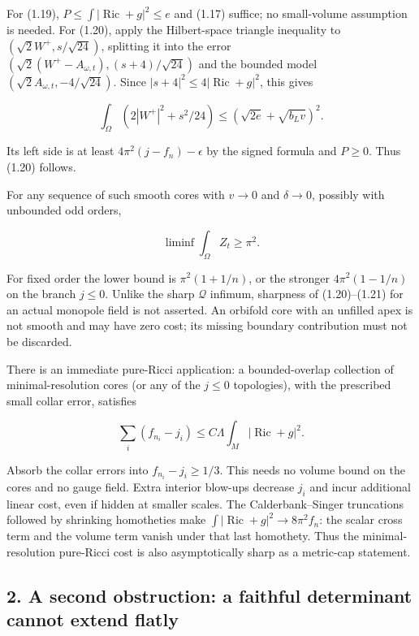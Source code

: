 \documentclass[
  10pt,
]{article}
\begin{document}
For (1.19), \(P\le\int|\operatorname{Ric}+g|^2\le e\) and (1.17)
suffice; no small-volume assumption is needed. For (1.20), apply the
Hilbert-space triangle inequality to \((\sqrt2W^+,s/\sqrt{24})\),
splitting it into the error
\((\sqrt2(W^+-A_{\omega,t}),(s+4)/\sqrt{24})\) and the bounded model
\((\sqrt2A_{\omega,t},-4/\sqrt{24})\). Since
\(|s+4|^2\le4|\operatorname{Ric}+g|^2\), this gives

\[
 \int_\Omega(2|W^+|^2+s^2/24)
                 \le(\sqrt{2e}+\sqrt{b_Lv})^2.
\]

Its left side is at least \(4\pi^2(j-f_n)-\epsilon\) by the signed
formula and \(P\ge0\). Thus (1.20) follows.

For any sequence of such smooth cores with \(v\to0\) and \(\delta\to0\),
possibly with unbounded odd orders,

\[
                       \boxed{\liminf\int_\Omega Z_t\ge\pi^2.} \tag{1.21}
\]

For fixed order the lower bound is \(\pi^2(1+1/n)\), or the stronger
\(4\pi^2(1-1/n)\) on the branch \(j\le0\). Unlike the sharp
\(\mathscr Q\) infimum, sharpness of (1.20)--(1.21) for an actual
monopole field is not asserted. An orbifold core with an unfilled apex
is not smooth and may have zero cost; its missing boundary contribution
must not be discarded.

There is an immediate pure-Ricci application: a bounded-overlap
collection of minimal-resolution cores (or any of the \(j\le0\)
topologies), with the prescribed small collar error, satisfies

\[
 \sum_i(f_{n_i}-j_i)\le C\Lambda
                         \int_M|\operatorname{Ric}+g|^2.        \tag{1.22}
\]

Absorb the collar errors into \(f_{n_i}-j_i\ge1/3\). This needs no
volume bound on the cores and no gauge field. Extra interior blow-ups
decrease \(j_i\) and incur additional linear cost, even if hidden at
smaller scales. The Calderbank--Singer truncations followed by shrinking
homotheties make \(\int|\operatorname{Ric}+g|^2\to8\pi^2f_n\): the
scalar cross term and the volume term vanish under that last homothety.
Thus the minimal-resolution pure-Ricci cost is also asymptotically sharp
as a metric-cap statement.

\hypertarget{a-second-obstruction-a-faithful-determinant-cannot-extend-flatly}{%
\subsection{2. A second obstruction: a faithful determinant cannot
extend
flatly}\label{a-second-obstruction-a-faithful-determinant-cannot-extend-flatly}}
\end{document}
